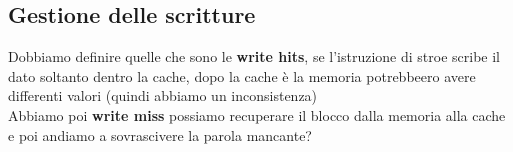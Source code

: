 \subsection{Gestione delle scritture}
Dobbiamo definire quelle che sono le \textbf{write hits}, se l'istruzione di stroe scribe il dato soltanto dentro la cache, dopo la cache
è la memoria potrebbeero avere differenti valori (quindi abbiamo un inconsistenza)\\

Abbiamo poi \textbf{write miss} possiamo recuperare il blocco dalla memoria alla cache e poi andiamo a sovrascivere la parola mancante?